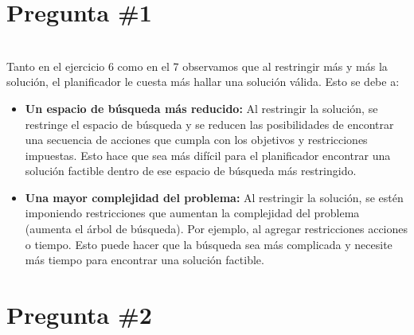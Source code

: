 \section{Pregunta \#1 }
\noindent{}
\quad\\
Tanto en el ejercicio 6 como en el 7 observamos que al restringir más y más la solución, el planificador le cuesta más hallar una solución válida. Esto se debe a:
\begin{itemize}
	\item \textbf{Un espacio de búsqueda más reducido:} Al restringir la solución, se restringe el espacio de búsqueda y se reducen las posibilidades de encontrar una secuencia de acciones que cumpla con los objetivos y restricciones impuestas. Esto hace que sea más difícil para el planificador encontrar una solución factible dentro de ese espacio de búsqueda más restringido.
	
	\item \textbf{Una mayor complejidad del problema:} Al restringir la solución, se estén imponiendo restricciones que aumentan la complejidad del problema (aumenta el árbol de búsqueda). Por ejemplo, al agregar restricciones acciones o tiempo. Esto puede hacer que la búsqueda sea más complicada y necesite más tiempo para encontrar una solución factible.
\end{itemize}

\section{Pregunta \#2}
\noindent{}
\quad\\

